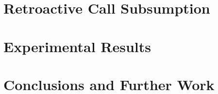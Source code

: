\documentclass[12pt,a4paper]{report}
\begin{document}
\newpage
\thispagestyle{plain}
\mbox{}

\chapter{Retroactive Call Subsumption}


\chapter{Experimental Results}


\newpage
\thispagestyle{plain}
\mbox{}

\chapter{Conclusions and Further Work}


\appendix


\newpage
\thispagestyle{plain}
\mbox{}
  
\renewcommand{\bibname}{References}

{}
\end{document}
